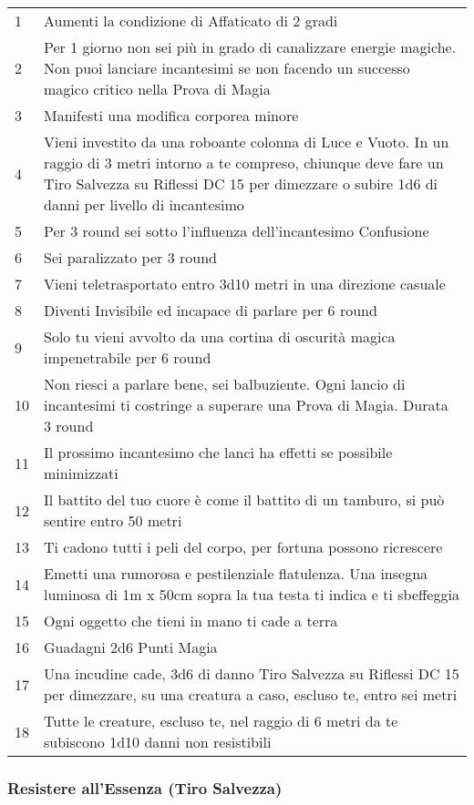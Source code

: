 \documentclass[a4paper,twoside,openany]{book}
\begin{document}
\begin{multicols}{2}
\medskip
{\small
	\begin{tabularx}{0.45\textwidth}{lX}
		\hline
1 & Aumenti la condizione di Affaticato di 2 gradi\\
2 & Per 1 giorno non sei più in grado di canalizzare energie magiche. Non puoi lanciare incantesimi se non facendo un successo magico critico nella Prova di Magia\\
3 & Manifesti una modifica corporea minore\\
4 & Vieni investito da una roboante colonna di Luce e Vuoto. In un raggio di 3 metri intorno a te compreso, chiunque deve fare un Tiro Salvezza su Riflessi DC 15 per dimezzare o subire 1d6 di danni per livello di incantesimo\\
5 & Per 3 round sei sotto l'influenza dell'incantesimo Confusione\\
6 & Sei paralizzato per 3 round\\
7 & Vieni teletrasportato entro 3d10 metri in una direzione casuale\\
8 & Diventi Invisibile ed incapace di parlare per 6 round\\
9 &  Solo tu vieni avvolto da una cortina di oscurità magica impenetrabile per 6 round\\
10 & Non riesci a parlare bene, sei balbuziente. Ogni lancio di incantesimi ti costringe a superare una Prova di Magia. Durata 3 round\\
11 & Il prossimo incantesimo che lanci ha effetti se possibile minimizzati\\
12 & Il battito del tuo cuore è come il battito di un tamburo, si può sentire entro 50 metri\\
13 & Ti cadono tutti i peli del corpo, per fortuna possono ricrescere\\
14 & Emetti una rumorosa e pestilenziale flatulenza. Una insegna luminosa di 1m x 50cm sopra la tua testa ti indica e ti sbeffeggia\\
15 & Ogni oggetto che tieni in mano ti cade a terra\\
16 & Guadagni 2d6 Punti Magia\\
17 & Una incudine cade, 3d6 di danno Tiro Salvezza su Riflessi DC 15 per dimezzare, su una creatura a caso, escluso te, entro sei metri\\
18 & Tutte le creature, escluso te, nel raggio di 6 metri da te subiscono 1d10 danni non resistibili\\
\end{tabularx}}


\subsubsection{Resistere all'Essenza (Tiro Salvezza)}


\end{multicols}
\end{document}
